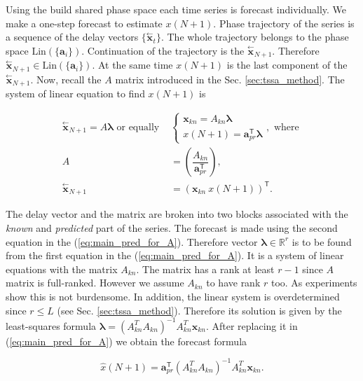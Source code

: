 \documentclass[referee, pdflatex, sn-mathphys-num]{sn-jnl}
\theoremstyle{definition}
\theoremstyle{plain}
\newcommand{\delayV}[1]{\overset{\leftarrow}{\mathbf{x}}_{#1}}
\begin{document}
	Using the build shared phase space each time series is forecast individually. We make a one-step forecast to estimate $ x(N + 1) $. Phase trajectory of the series is a sequence of the delay vectors $ \{ \delayV{t} \} $. The whole trajectory belongs to the phase space $ \text{Lin}(\{\mathbf{a}_i\}) $. Continuation of the trajectory is the $ \delayV{N + 1} $. Therefore $ \delayV{N + 1} \in \text{Lin}(\{\mathbf{a}_i\}) $. At the same time $ x(N + 1) $ is the last component of the $ \delayV{N + 1} $. Now, recall the $ A $ matrix introduced in the Sec. \ref{sec:tssa_method}. The system of linear equation to find $ x(N + 1) $ is
	
	\begin{align}\label{eq:main_pred_for_A}
		\delayV{N + 1} = A \boldsymbol{\lambda} \text{ or equally } &\begin{cases}
			\mathbf{x}_{kn} = A_{kn} \boldsymbol{\lambda}  \\
			x(N + 1) = \mathbf{a}_{pr}^{\mathsf{T}} \boldsymbol{\lambda}
		\end{cases}, \text{ where } \\
		A &= \left( \dfrac{A_{kn}}{\mathbf{a}_{pr}^{\mathsf{T}}} \right), \nonumber \\
		\delayV{N + 1} &= (\mathbf{x}_{kn} \  x(N + 1))^{\mathsf{T}}. \nonumber
	\end{align}
	
	The delay vector and the matrix are broken into two blocks associated with the \emph{known} and \emph{predicted} part of the series. The forecast is made using the second equation in the (\ref{eq:main_pred_for_A}). Therefore vector $ \boldsymbol{\lambda} \in \mathbb{R}^r $ is to be found from the first equation in the (\ref{eq:main_pred_for_A}). It is a system of linear equations with the matrix $ A_{kn} $. The matrix has a rank at least $ r - 1 $ since $ A $ matrix is full-ranked. However we assume $ A_{kn} $ to have rank $ r $ too. As experiments show this is not burdensome. In addition, the linear system is overdetermined since $ r \le L $ (see Sec. \ref{sec:tssa_method}). Therefore its solution is given by the least-squares formula $ \boldsymbol{\lambda} = (A_{kn}^T A_{kn})^{-1} A_{kn}^T \mathbf{x}_{kn} $. After replacing it in (\ref{eq:main_pred_for_A}) we obtain the forecast formula
	
	\begin{equation}\label{eq:tssa_pred}
		\hat{x}(N + 1) = \mathbf{a}_{pr}^{\mathsf{T}} (A_{kn}^T A_{kn})^{-1} A_{kn}^T \mathbf{x}_{kn}.
	\end{equation}
	
\end{document}
